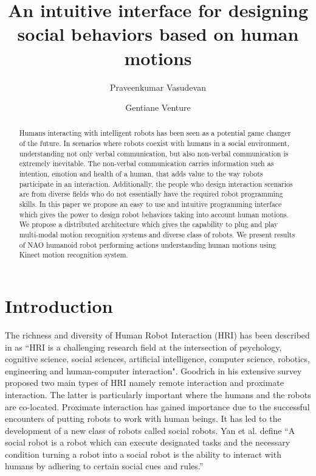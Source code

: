 \documentclass{llncs}
\title{An intuitive interface for designing social behaviors based on human motions}
\author{Praveenkumar Vasudevan\inst{1} \and Gentiane Venture\inst{2}}
\institute{Graduate Student, \'{E}cole Centrale de Nantes, Nantes, France,\\
\email{praveenv4k@gmail.com}
\and
Associate Professor, Tokyo University of Agriculture and Technology, Japan\\
\email{venture@cc.tuat.ac.jp}}
\begin{document}
\maketitle   
\begin{abstract}
	Humans interacting with intelligent robots has been seen as a potential game changer of the future. In scenarios where robots coexist with humans in a social environment, understanding not only verbal communication, but also non-verbal communication is extremely inevitable. The non-verbal communication carries information such as intention, emotion and health of a human, that adds value to the way robots participate in an interaction. Additionally, the people who design interaction scenarios are from diverse fields who do not essentially have the required robot programming skills. In this paper we propose an easy to use and intuitive programming interface which gives the power to design robot behaviors taking into account human motions. We propose a distributed architecture which gives the capability to plug and play multi-modal motion recognition systems and diverse class of robots. We present results of NAO humanoid robot performing actions understanding human motions using Kinect motion recognition system.
\end{abstract}
\section{Introduction}
\quad The richness and diversity of Human Robot Interaction (HRI) has been described in \cite{dautenhahn2007methodology} as ``HRI is a challenging research field at the intersection of psychology, cognitive science, social sciences, artificial intelligence, computer science, robotics, engineering and human-computer interaction". Goodrich in his extensive survey \cite{goodrich2007human} proposed two main types of HRI namely remote interaction and proximate interaction. The latter is particularly important where the humans and the robots are co-located. Proximate interaction has gained importance due to the successful encounters of putting robots to work with human beings. It has led to the development of a new class of robots called social robots. Yan et al. \cite{yan2014survey} define ``A social robot is a robot which can execute designated tasks and the necessary condition turning a robot into a social robot is the ability to interact with humans by adhering to certain social cues and rules.''
\end{document}
